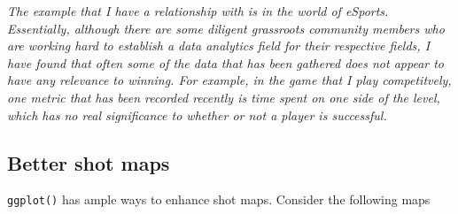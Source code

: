 \documentclass[]{article}
\newenvironment{Shaded}{\begin{snugshade}}{\end{snugshade}}
\newcommand{\DataTypeTok}[1]{\textcolor[rgb]{0.13,0.29,0.53}{#1}}
\newcommand{\KeywordTok}[1]{\textcolor[rgb]{0.13,0.29,0.53}{\textbf{#1}}}
\newcommand{\NormalTok}[1]{#1}
\newcommand{\OperatorTok}[1]{\textcolor[rgb]{0.81,0.36,0.00}{\textbf{#1}}}
\newcommand{\StringTok}[1]{\textcolor[rgb]{0.31,0.60,0.02}{#1}}
\begin{document}
\emph{The example that I have a relationship with is in the world of
eSports. Essentially, although there are some diligent grassroots
community members who are working hard to establish a data analytics
field for their respective fields, I have found that often some of the
data that has been gathered does not appear to have any relevance to
winning. For example, in the game that I play competitvely, one metric
that has been recorded recently is time spent on one side of the level,
which has no real significance to whether or not a player is
successful.}

\hypertarget{better-shot-maps}{%
\subsection{Better shot maps}\label{better-shot-maps}}

\texttt{ggplot()} has ample ways to enhance shot maps. Consider the
following maps

\begin{Shaded}
\end{Shaded}
\end{document}
